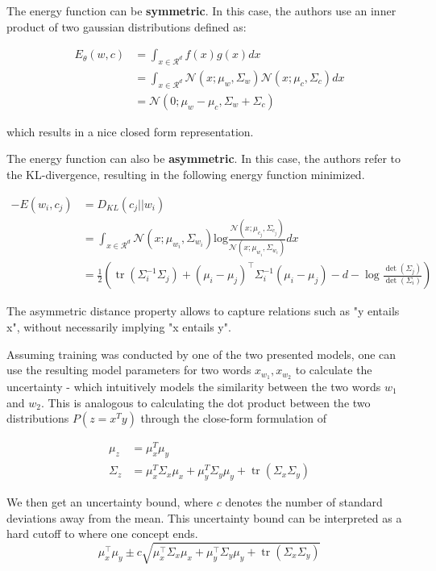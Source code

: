 \documentclass[a4paper,12pt,oneside,openright]{report}
\begin{document}
The energy function can be \textbf{symmetric}.
In this case, the authors use an inner product of two gaussian distributions defined as:

\begin{align}
E_\theta(w, c) &= \int_{x \in \mathcal{R}^d} f(x)g(x) dx \\
&= \int_{x \in \mathcal{R}^d} \mathcal{N}(x; \mu_w, \Sigma_w) \mathcal{N}(x; \mu_c, \Sigma_c) dx \\
&= \mathcal{N}(0; \mu_w - \mu_c, \Sigma_w + \Sigma_c)
\end{align}

which results in a nice closed form representation. 

The energy function can also be \textbf{asymmetric}.
In this case, the authors refer to the KL-divergence, resulting in the following energy function minimized.

\begin{align}
-E(w_i, c_j) & = D_{KL}(c_j || w_i) \\
&= \int_{x \in \mathcal{R}^d} \mathcal{N}(x; \mu_{w_i}, \Sigma_{w_i}) \text{log} \frac{\mathcal{N}(x; \mu_{c_j}, \Sigma_{c_j})}{\mathcal{N}(x; \mu_{w_i}, \Sigma_{w_i})} dx \\
&= \frac{1}{2}\left(\operatorname{tr}\left(\Sigma_{i}^{-1} \Sigma_{j}\right)+\left(\mu_{i}-\mu_{j}\right)^{\top} \Sigma_{i}^{-1}\left(\mu_{i}-\mu_{j}\right)-d-\log \frac{\operatorname{det}\left(\Sigma_{j}\right)}{\operatorname{det}\left(\Sigma_{i}\right)}\right)
\end{align}

The asymmetric distance property allows to capture relations such as "y entails x", without necessarily implying "x entails y".

Assuming training was conducted by one of the two presented models,  one can use the resulting model parameters for two words $x_{w_1}, x_{w_2}$ to calculate the uncertainty - which intuitively models the similarity between the two words $w_1$ and $w_2$.
This is analogous to calculating the dot product between the two distributions $P(z=x^T y)$ through the close-form formulation of

\begin{align}
\mu_z &= \mu_x^T \mu_y \\
\Sigma_z &= \mu_{x}^T \Sigma_{x} \mu_{x}+\mu_{y}^T \Sigma_{y} \mu_{y}+\operatorname{tr}\left(\Sigma_{x} \Sigma_{y}\right)
\end{align}

We then get an uncertainty bound, where $c$ denotes the number of standard deviations away from the mean.
This uncertainty bound can be interpreted as a hard cutoff to where one concept ends.
\begin{equation}
\mu_{x}^{\top} \mu_{y} \pm c \sqrt{\mu_{x}^{\top} \Sigma_{x} \mu_{x}+\mu_{y}^{\top} \Sigma_{y} \mu_{y}+\operatorname{tr}\left(\Sigma_{x} \Sigma_{y}\right)}
\end{equation}
\end{document}
